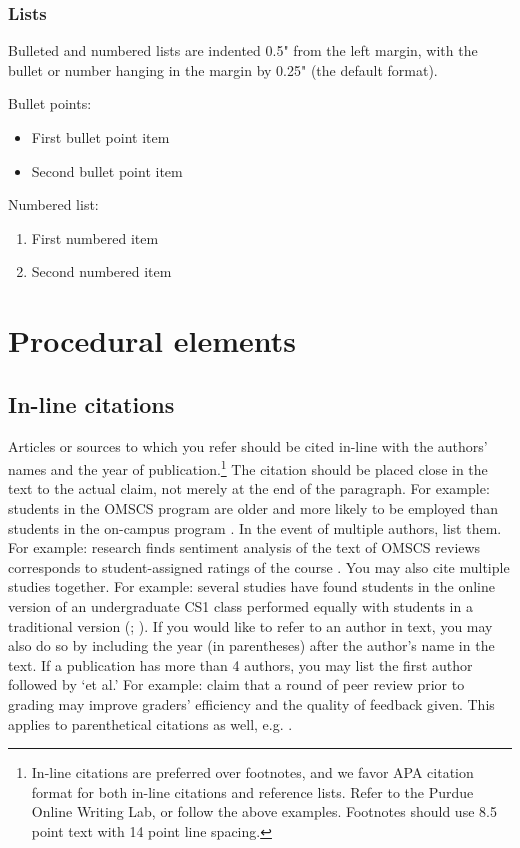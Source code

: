 \documentclass[
	letterpaper, %
]{jdf}
\begin{document}
\subsubsection{Lists}
Bulleted and numbered lists are indented 0.5" from the left margin, with the bullet or number hanging in the margin by 0.25" (the default format).

Bullet points:

\begin{itemize}
	\item First bullet point item
	\item Second bullet point item
\end{itemize}

Numbered list:

\begin{enumerate}
	\item First numbered item
	\item Second numbered item
\end{enumerate}

\section{Procedural elements}
\subsection{In-line citations}
Articles or sources to which you refer should be cited in-line with the authors’ names and the year of publication.\footnote{In-line citations are preferred over footnotes, and we favor APA citation format for both in-line citations and reference lists. Refer to the Purdue Online Writing Lab, or follow the above examples. Footnotes should use 8.5 point text with 14 point line spacing.} The citation should be placed close in the text to the actual claim, not merely at the end of the paragraph. For example: students in the OMSCS program are older and more likely to be employed than students in the on-campus program \citep{joyner2017}. In the event of multiple authors, list them. For example: research finds sentiment analysis of the text of OMSCS reviews corresponds to student-assigned ratings of the course \citep{newman2018}. You may also cite multiple studies together. For example: several studies have found students in the online version of an undergraduate CS1 class performed equally with students in a traditional version (\cite{joyner2018a}; \cite{joyner2018b}). If you would like to refer to an author in text, you may also do so by including the year (in parentheses) after the author’s name in the text. If a publication has more than 4 authors, you may list the first author followed by ‘et al.’ For example:  claim that a round of peer review prior to grading may improve graders’ efficiency and the quality of feedback given. This applies to parenthetical citations as well, e.g. \citep{joyner2016}.
\end{document}
